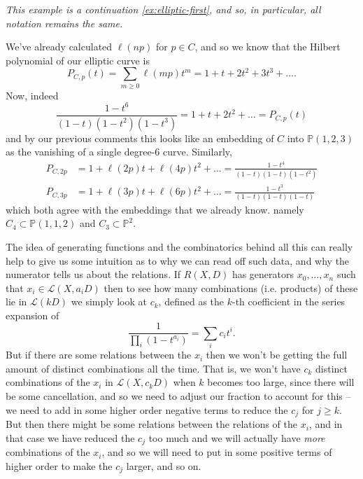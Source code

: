 \documentclass[10pt,notitlepage]{article}
\numberwithin{equation}{subsection}
\newcommand{\pee}{\mathbb{P}}
\begin{document}
        \begin{example}\label{ex:elliptic-second}

            \emph{This example is a continuation \cref{ex:elliptic-first}, and so, in particular, all notation remains the same.}

            \bigskip

            We've already calculated $\ell(np)$ for $p\in C$, and so we know that the Hilbert polynomial of our elliptic curve is
            \[
                P_{C,p}(t) = \sum_{m\geqslant0}\ell(mp)t^m = 1+t+2t^2+3t^3+\ldots.
            \]
            Now, indeed
            \[
                \frac{1-t^6}{(1-t)(1-t^2)(1-t^3)} = 1+t+2t^2+\ldots = P_{C,p}(t)
            \]
            and by our previous comments this looks like an embedding of $C$ into $\pee(1,2,3)$ as the vanishing of a single degree-$6$ curve.
            Similarly,
            \begin{align*}
                P_{C,2p} &= 1+\ell(2p)t+\ell(4p)t^2+\ldots = \frac{1-t^4}{(1-t)(1-t)(1-t^2)} \\
                P_{C,3p} &= 1+\ell(3p)t+\ell(6p)t^2+\ldots = \frac{1-t^3}{(1-t)(1-t)(1-t)}
            \end{align*}
            which both agree with the embeddings that we already know. namely $C_4\subset\pee(1,1,2)$ and $C_3\subset\pee^2$.
        \end{example}

        The idea of generating functions and the combinatorics behind all this can really help to give us some intuition as to why we can read off such data, and why the numerator tells us about the relations.
        If $R(X,D)$ has generators $x_0,\ldots,x_n$ such that $x_i\in\mathcal{L}(X,a_iD)$ then to see how many combinations (i.e. products) of these lie in $\mathcal{L}(kD)$ we simply look at $c_k$, defined as the $k$-th coefficient in the series expansion of
        \[
            \frac{1}{\prod_i(1-t^{a_i})} = \sum_i c_i t^i.
        \]
        But if there are some relations between the $x_i$ then we won't be getting the full amount of distinct combinations all the time.
        That is, we won't have $c_k$ distinct combinations of the $x_i$ in $\mathcal{L}(X,c_kD)$ when $k$ becomes too large, since there will be some cancellation, and so we need to adjust our fraction to account for this -- we need to add in some higher order negative terms to reduce the $c_j$ for $j\geqslant k$.
        But then there might be some relations between the relations of the $x_i$, and in that case we have reduced the $c_j$ too much and we will actually have \emph{more} combinations of the $x_i$, and so we will need to put in some positive terms of higher order to make the $c_j$ larger, and so on.
\end{document}
